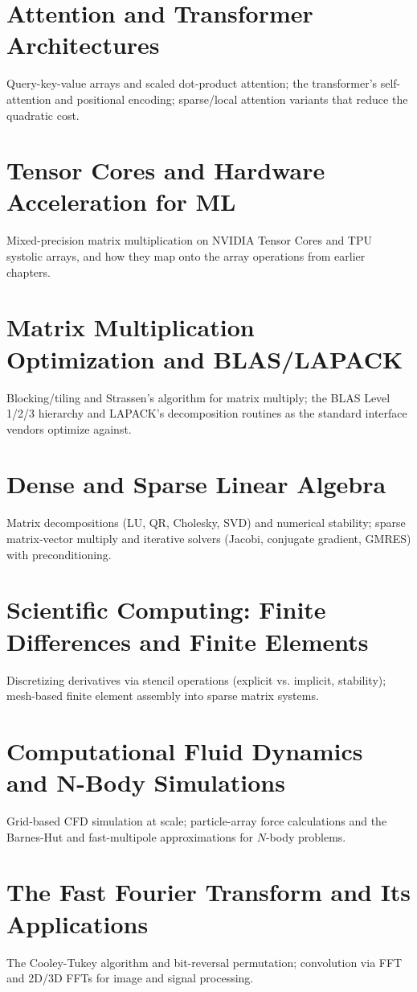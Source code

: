 \chapter{Attention and Transformer Architectures}
Query-key-value arrays and scaled dot-product attention; the transformer's self-attention and positional encoding; sparse/local attention variants that reduce the quadratic cost.

\chapter{Tensor Cores and Hardware Acceleration for ML}
Mixed-precision matrix multiplication on NVIDIA Tensor Cores and TPU systolic arrays, and how they map onto the array operations from earlier chapters.

\chapter{Matrix Multiplication Optimization and BLAS/LAPACK}
Blocking/tiling and Strassen's algorithm for matrix multiply; the BLAS Level 1/2/3 hierarchy and LAPACK's decomposition routines as the standard interface vendors optimize against.

\chapter{Dense and Sparse Linear Algebra}
Matrix decompositions (LU, QR, Cholesky, SVD) and numerical stability; sparse matrix-vector multiply and iterative solvers (Jacobi, conjugate gradient, GMRES) with preconditioning.

\chapter{Scientific Computing: Finite Differences and Finite Elements}
Discretizing derivatives via stencil operations (explicit vs. implicit, stability); mesh-based finite element assembly into sparse matrix systems.

\chapter{Computational Fluid Dynamics and N-Body Simulations}
Grid-based CFD simulation at scale; particle-array force calculations and the Barnes-Hut and fast-multipole approximations for $N$-body problems.

\chapter{The Fast Fourier Transform and Its Applications}
The Cooley-Tukey algorithm and bit-reversal permutation; convolution via FFT and 2D/3D FFTs for image and signal processing.

